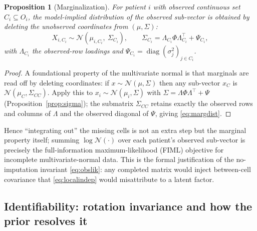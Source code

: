 \documentclass[11pt]{article}
\theoremstyle{plain}
\newtheorem{proposition}{Proposition}
\theoremstyle{definition}
\begin{document}
\begin{proposition}[Marginalization]\label{prop:marg}
For patient $i$ with observed continuous set $C_i\subseteq O_i$, the model-implied
distribution of the observed sub-vector is obtained by \emph{deleting} the unobserved
coordinates from $(\mu,\Sigma)$:
\begin{equation}
  X_{i,C_i}\sim\mathcal{N}\!\left(\mu_{i,C_i},\ \Sigma_{C_i}\right),\qquad
  \Sigma_{C_i}=\Lambda_{C_i}\Phi\Lambda_{C_i}^{\top}+\Psi_{C_i},
  \label{eq:margdist}
\end{equation}
with $\Lambda_{C_i}$ the observed-row loadings and
$\Psi_{C_i}=\operatorname{diag}(\sigma_j^2)_{j\in C_i}$.
\end{proposition}
\begin{proof}
A foundational property of the multivariate normal is that marginals are read off by
deleting coordinates: if $x\sim\mathcal N(\mu,\Sigma)$ then any sub-vector $x_{C}$ is
$\mathcal N(\mu_C,\Sigma_{CC})$. Apply this to $x_i\sim\mathcal N(\mu_i,\Sigma)$ with
$\Sigma=\Lambda\Phi\Lambda^\top+\Psi$ (Proposition~\ref{prop:sigma}); the submatrix
$\Sigma_{CC}$ retains exactly the observed rows and columns of $\Lambda$ and the observed
diagonal of $\Psi$, giving \eqref{eq:margdist}.
\end{proof}
\noindent
Hence ``integrating out'' the missing cells is not an extra step but the marginal property
itself; summing $\log\mathcal N(\cdot)$ over each patient's observed sub-vector is precisely
the full-information maximum-likelihood (FIML) objective for incomplete
multivariate-normal data. This is the formal justification of the no-imputation invariant
\eqref{eq:obslik}: any completed matrix would inject between-cell covariance that
\eqref{eq:localindep} would misattribute to a latent factor.

\subsection{Identifiability: rotation invariance and how the prior resolves it}
\label{sub:rotation}
\end{document}
